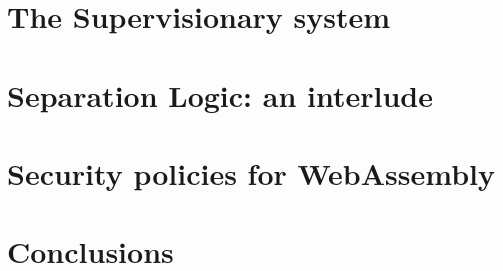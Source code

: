 \documentclass[a4paper, 10pt]{article}
\begin{document}
\section{The Supervisionary system}
\label{sect.supervisionary.system}

\section{Separation Logic: an interlude}
\label{sect.separation.logic.an.interlude}

\section{Security policies for WebAssembly}
\label{sect.security.policies.for.webassembly}

\section{Conclusions}
\label{sect.conclusions}
\end{document}
